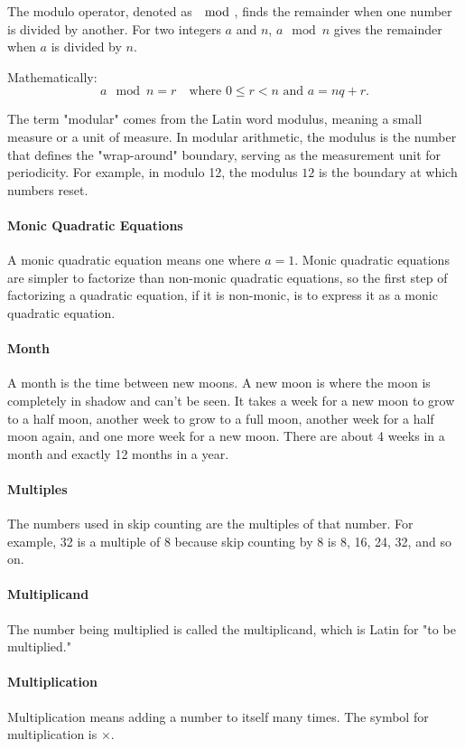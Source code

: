 \documentclass[12pt]{article}
\begin{document}
{The modulo operator, denoted as \( \mod \), finds the remainder when one number is divided by another. For two integers \( a \) and \( n \), \( a \mod n \) gives the remainder when \( a \) is divided by \( n \). 

Mathematically:
\[
a \mod n = r \quad \text{where } 0 \leq r < n \text{ and } a = nq + r.
\]

The term "modular" comes from the Latin word modulus, meaning a small measure or a unit of measure. In modular arithmetic, the modulus is the number that defines the "wrap-around" boundary, serving as the measurement unit for periodicity. For example, in modulo 12, the modulus \( 12 \) is the boundary at which numbers reset.

\paragraph{Monic Quadratic Equations}
A monic quadratic equation means one where $a=1$. Monic quadratic equations are simpler to factorize than non-monic quadratic equations, so the first step of factorizing a quadratic equation, if it is non-monic, is to express it as a monic quadratic equation.

\paragraph{Month}
A month is the time between new moons. A new moon is where the moon is completely in shadow and can't be seen. It takes a week for a new moon to grow to a half moon, another week to grow to a full moon, another week for a half moon again, and one more week for a new moon. There are about 4 weeks in a month and exactly 12 months in a year.

\paragraph{Multiples}
The numbers used in skip counting are the multiples of that number. For example, 32 is a multiple of 8 because skip counting by 8 is 8, 16, 24, 32, and so on.

\paragraph{Multiplicand}
The number being multiplied is called the multiplicand, which is Latin for "to be multiplied."

\paragraph{Multiplication}
Multiplication means adding a number to itself many times. The symbol for multiplication is $\times$.

}
\end{document}

